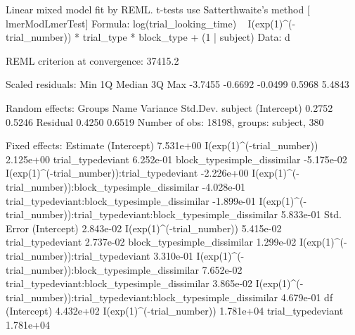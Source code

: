 \documentclass[10pt, letterpaper]{article}
\newenvironment{CodeChunk}{}{}
\begin{document}
\begin{CodeChunk}
\begin{CodeOutput}
Linear mixed model fit by REML. t-tests use Satterthwaite's method [
lmerModLmerTest]
Formula: log(trial_looking_time) ~ I(exp(1)^(-trial_number)) * trial_type *  
    block_type + (1 | subject)
   Data: d

REML criterion at convergence: 37415.2

Scaled residuals: 
    Min      1Q  Median      3Q     Max 
-3.7455 -0.6692 -0.0499  0.5968  5.4843 

Random effects:
 Groups   Name        Variance Std.Dev.
 subject  (Intercept) 0.2752   0.5246  
 Residual             0.4250   0.6519  
Number of obs: 18198, groups:  subject, 380

Fixed effects:
                                                                          Estimate
(Intercept)                                                              7.531e+00
I(exp(1)^(-trial_number))                                                2.125e+00
trial_typedeviant                                                        6.252e-01
block_typesimple_dissimilar                                             -5.175e-02
I(exp(1)^(-trial_number)):trial_typedeviant                             -2.226e+00
I(exp(1)^(-trial_number)):block_typesimple_dissimilar                   -4.028e-01
trial_typedeviant:block_typesimple_dissimilar                           -1.899e-01
I(exp(1)^(-trial_number)):trial_typedeviant:block_typesimple_dissimilar  5.833e-01
                                                                        Std. Error
(Intercept)                                                              2.843e-02
I(exp(1)^(-trial_number))                                                5.415e-02
trial_typedeviant                                                        2.737e-02
block_typesimple_dissimilar                                              1.299e-02
I(exp(1)^(-trial_number)):trial_typedeviant                              3.310e-01
I(exp(1)^(-trial_number)):block_typesimple_dissimilar                    7.652e-02
trial_typedeviant:block_typesimple_dissimilar                            3.865e-02
I(exp(1)^(-trial_number)):trial_typedeviant:block_typesimple_dissimilar  4.679e-01
                                                                                df
(Intercept)                                                              4.432e+02
I(exp(1)^(-trial_number))                                                1.781e+04
trial_typedeviant                                                        1.781e+04

\end{CodeOutput}
\end{CodeChunk}
\end{document}
